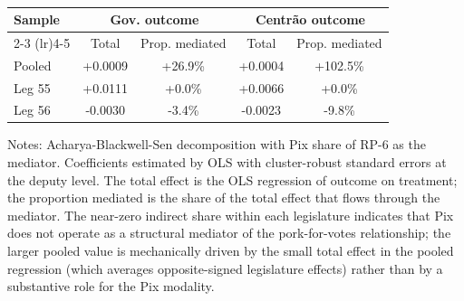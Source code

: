 \begin{table}[htbp]
\centering
\caption{}
\label{tab:t3_dual}
\begin{threeparttable}
\small
\begin{tabular}{lcccc}
\toprule
Sample & \multicolumn{2}{c}{Gov. outcome} & \multicolumn{2}{c}{Centrão outcome} \\
\cmidrule(lr){2-3} \cmidrule(lr){4-5}
 & Total & Prop. mediated & Total & Prop. mediated \\
\midrule
Pooled & +0.0009 & +26.9\% & +0.0004 & +102.5\% \\
Leg 55 & +0.0111 & +0.0\% & +0.0066 & +0.0\% \\
Leg 56 & -0.0030 & -3.4\% & -0.0023 & -9.8\% \\
\bottomrule
\end{tabular}
\begin{tablenotes}
\small
\item Notes: Acharya-Blackwell-Sen decomposition with Pix share of RP-6 as the mediator. Coefficients estimated by OLS with cluster-robust standard errors at the deputy level. The total effect is the OLS regression of outcome on treatment; the proportion mediated is the share of the total effect that flows through the mediator. The near-zero indirect share within each legislature indicates that Pix does not operate as a structural mediator of the pork-for-votes relationship; the larger pooled value is mechanically driven by the small total effect in the pooled regression (which averages opposite-signed legislature effects) rather than by a substantive role for the Pix modality.
\end{tablenotes}
\end{threeparttable}
\end{table}